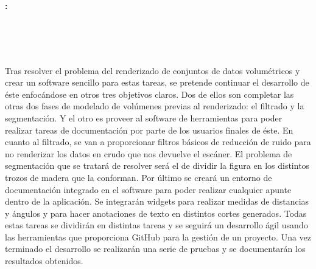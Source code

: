 \chapter*{}



\cleardoublepage
\thispagestyle{empty}

\begin{center}
{\large\bfseries \myTitle: \mySubtitle}\\
\end{center}

\begin{center}
\myName \\
\end{center}

\vspace{0.7cm}
\\

\vspace{0.7cm}
\\

Tras resolver el problema del renderizado de conjuntos de datos volumétricos y crear un software sencillo para estas tareas, se pretende continuar el desarrollo de éste enfocándose en otros tres objetivos claros. Dos de ellos son completar las otras dos fases de modelado de volúmenes previas al renderizado: el filtrado y la segmentación. Y el otro es proveer al software de herramientas para poder realizar tareas de documentación por parte de los usuarios finales de éste. En cuanto al filtrado, se van a proporcionar filtros básicos de reducción de ruido para no renderizar los datos en crudo que nos devuelve el escáner. El problema de segmentación que se tratará de resolver será el de dividir la figura en los distintos trozos de madera que la conforman. Por último se creará un entorno de documentación integrado en el software para poder realizar cualquier apunte dentro de la aplicación. Se integrarán widgets para realizar medidas de distancias y ángulos y para hacer anotaciones de texto en distintos cortes generados. Todas estas tareas se dividirán en distintas tareas y se seguirá un desarrollo ágil usando las herramientas que proporciona GitHub para la gestión de un proyecto. Una vez terminado el desarrollo se realizarán una serie de pruebas y se documentarán los resultados obtenidos.

